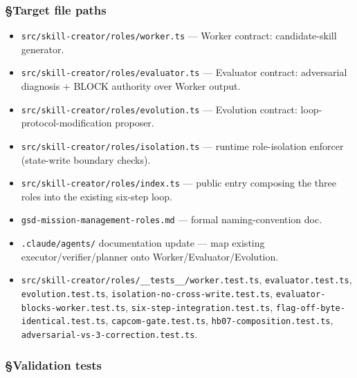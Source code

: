 \documentclass[11pt,letterpaper]{article}
\providecommand{\tightlist}{\setlength{\itemsep}{0pt}\setlength{\parskip}{0pt}}
\begin{document}
\subsubsection{§Target file paths}

\begin{itemize}
\tightlist
\item
  \texttt{src/skill-creator/roles/worker.ts} --- Worker contract:
  candidate-skill generator.
\item
  \texttt{src/skill-creator/roles/evaluator.ts} --- Evaluator contract:
  adversarial diagnosis + BLOCK authority over Worker output.
\item
  \texttt{src/skill-creator/roles/evolution.ts} --- Evolution contract:
  loop-protocol-modification proposer.
\item
  \texttt{src/skill-creator/roles/isolation.ts} --- runtime
  role-isolation enforcer (state-write boundary checks).
\item
  \texttt{src/skill-creator/roles/index.ts} --- public entry composing
  the three roles into the existing six-step loop.
\item
  \texttt{gsd-mission-management-roles.md} --- formal naming-convention
  doc.
\item
  \texttt{.claude/agents/} documentation update --- map existing
  executor/verifier/planner onto Worker/Evaluator/Evolution.
\item
  \texttt{src/skill-creator/roles/\_\_tests\_\_/worker.test.ts},
  \texttt{evaluator.test.ts}, \texttt{evolution.test.ts},
  \texttt{isolation-no-cross-write.test.ts},
  \texttt{evaluator-blocks-worker.test.ts},
  \texttt{six-step-integration.test.ts},
  \texttt{flag-off-byte-identical.test.ts},
  \texttt{capcom-gate.test.ts}, \texttt{hb07-composition.test.ts},
  \texttt{adversarial-vs-3-correction.test.ts}.
\end{itemize}

\subsubsection{§Validation tests}
\end{document}
